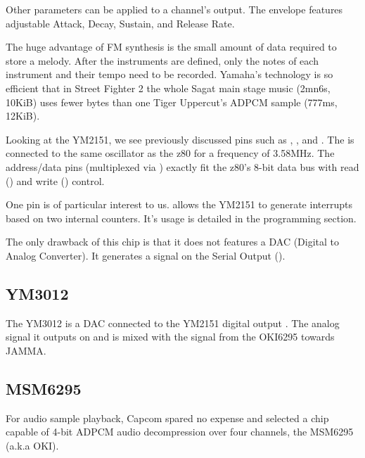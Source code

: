 Other parameters can be applied to a channel's output. The envelope features adjustable Attack, Decay, Sustain, and Release Rate. 


The huge advantage of FM synthesis is the small amount of data required to store a melody. After the instruments are defined, only the notes of each instrument and their tempo need to be recorded. Yamaha's technology is so efficient that in Street Fighter 2 the whole Sagat main stage music (2mn6s, 10KiB) uses fewer bytes than one Tiger Uppercut's ADPCM sample (777ms, 12KiB).




Looking at the YM2151, we see previously discussed pins such as , , and . The  is connected to the same oscillator as the z80 for a frequency of 3.58MHz. The  address/data pins (multiplexed via ) exactly fit the z80's 8-bit data bus with read () and write () control.


One pin is of particular interest to us.  allows the YM2151 to generate interrupts based on two internal counters. It's usage is detailed in the programming section.


The only drawback of this chip is that it does not features a DAC (Digital to Analog Converter). It generates a signal on the Serial Output (). 

\subsection{YM3012}

The YM3012 is a DAC connected to the YM2151 digital output . The analog signal it outputs on  and  is mixed with the signal from the OKI6295 towards JAMMA.



\subsection{MSM6295}

For audio sample playback, Capcom spared no expense and selected a chip capable of 4-bit ADPCM audio decompression over four channels, the MSM6295 (a.k.a OKI). 

